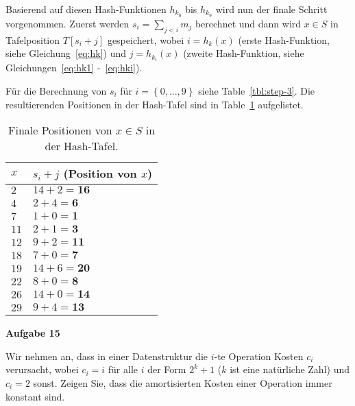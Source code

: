 \documentclass{article}
\begin{document}
Basierend auf diesen Hash-Funktionen $h_{k_0}$ bis $h_{k_9}$ wird nun der finale
Schritt vorgenommen. Zuerst werden $s_i = \sum_{j < i} m_j$ berechnet und dann
wird $x \in S$ in Tafelposition $T\left[ s_i + j \right]$ gespeichert, wobei
$i = h_k \left( x \right)$ (erste Hash-Funktion, siehe Gleichung~\ref{eq:hk}) und
$j = h_{k_i} \left( x \right)$ (zweite Hash-Funktion, siehe
Gleichungen~\ref{eq:hk1} -~\ref{eq:hki}).

F{\"u}r die Berechnung von $s_i$ f{\"u}r $i = \left\{ 0, \ldots, 9 \right\}$ siehe
Table~\ref{tbl:step-3}. Die resultierenden Positionen in der Hash-Tafel sind in
Table~\ref{tbl:final-pos} aufgelistet.

\begin{table}[H]
  \centering
  \begin{tabular}{l|l}
    $x$ & $s_i + j$ (Position von $x$)  \tabularnewline
    \hline\hline
    $2$ & $14 + 2 = \textbf{16}$        \tabularnewline
    \hline
    $4$ & $2 + 4 = \textbf{6}$          \tabularnewline
    \hline
    $7$ & $1 + 0 = \textbf{1}$          \tabularnewline
    \hline
    $11$ & $2 + 1 = \textbf{3}$         \tabularnewline
    \hline
    $12$ & $9 + 2 = \textbf{11}$         \tabularnewline
    \hline
    $18$ & $7 + 0 = \textbf{7}$         \tabularnewline
    \hline
    $19$ & $14 + 6 = \textbf{20}$       \tabularnewline
    \hline
    $22$ & $8 + 0 = \textbf{8}$         \tabularnewline
    \hline
    $26$ & $14 + 0 = \textbf{14}$       \tabularnewline
    \hline
    $29$ & $9 + 4 = \textbf{13}$        \tabularnewline
    \hline
  \end{tabular}
  \caption{Finale Positionen von $x \in S$ in der Hash-Tafel.}
  \label{tbl:final-pos}
\end{table}

\clearpage

{\bfseries Aufgabe 15}%

Wir nehmen an, dass in einer Datenstruktur die $i$-te Operation Kosten $c_i$
verursacht, wobei $c_i = i$ f{\"u}r alle $i$ der Form $2^k + 1$ ($k$ ist eine
nat{\"u}rliche Zahl) und $c_i = 2$ sonst. Zeigen Sie, dass die amortisierten
Kosten einer Operation immer konstant sind.
\end{document}
